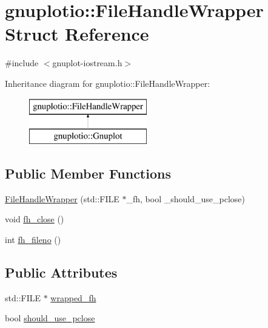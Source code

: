 \hypertarget{structgnuplotio_1_1_file_handle_wrapper}{}\section{gnuplotio\+:\+:File\+Handle\+Wrapper Struct Reference}
\label{structgnuplotio_1_1_file_handle_wrapper}


{\ttfamily \#include $<$gnuplot-\/iostream.\+h$>$}

Inheritance diagram for gnuplotio\+:\+:File\+Handle\+Wrapper\+:\begin{figure}[H]
\begin{center}
\leavevmode
\includegraphics[height=2.000000cm]{structgnuplotio_1_1_file_handle_wrapper}
\end{center}
\end{figure}
\subsection*{Public Member Functions}
\begin{DoxyCompactItemize}
\item 
\hyperlink{structgnuplotio_1_1_file_handle_wrapper_a26b2378e193a9c41be5aed97e11f9411}{File\+Handle\+Wrapper} (std\+::\+F\+I\+LE $\ast$\+\_\+fh, bool \+\_\+should\+\_\+use\+\_\+pclose)
\item 
void \hyperlink{structgnuplotio_1_1_file_handle_wrapper_acafac45efd9c78ce621af4f3228c6f67}{fh\+\_\+close} ()
\item 
int \hyperlink{structgnuplotio_1_1_file_handle_wrapper_a3202ccd15d624f26dd2cf699d3456de6}{fh\+\_\+fileno} ()
\end{DoxyCompactItemize}
\subsection*{Public Attributes}
\begin{DoxyCompactItemize}
\item 
std\+::\+F\+I\+LE $\ast$ \hyperlink{structgnuplotio_1_1_file_handle_wrapper_adcb58bfcd9dbdba000a7e7395bee2ef9}{wrapped\+\_\+fh}
\item 
bool \hyperlink{structgnuplotio_1_1_file_handle_wrapper_a11b63ed64cf53167e26c5273778d90ea}{should\+\_\+use\+\_\+pclose}
\end{DoxyCompactItemize}


